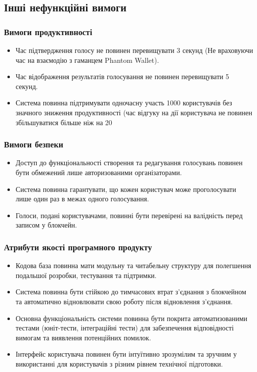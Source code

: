 \documentclass[14pt]{extreport}
\begin{document}
  \subsection{Інші нефункційні вимоги}
  \subsubsection{Вимоги продуктивності}
  \begin{itemize}
    \item Час підтвердження голосу не повинен перевищувати 3 секунд (Не враховуючи час на взаємодію з гаманцем Phantom Wallet).
    \item Час відображення результатів голосування не повинен перевищувати 5 секунд.  
    \item Система повинна підтримувати одночасну участь 1000 користувачів без значного зниження продуктивності (час відгуку на дії користувача не повинен збільшуватися більше ніж на 20%
  \end{itemize}

  \subsubsection{Вимоги безпеки}
  \begin{itemize}
    \item Доступ до функціональності створення та редагування голосувань повинен бути обмежений лише авторизованими організаторами.
    \item Система повинна гарантувати, що кожен користувач може проголосувати лише один раз в межах одного голосування.
    \item Голоси, подані користувачами, повинні бути перевірені на валідність перед записом у блокчейн.
  \end{itemize}
  
  \subsubsection{Атрибути якості програмного продукту}
  \begin{itemize}  
    \item Кодова база повинна мати модульну та читабельну структуру для полегшення подальшої розробки, тестування та підтримки.
    \item Система повинна бути стійкою до тимчасових втрат з'єднання з блокчейном та автоматично відновлювати свою роботу після відновлення з'єднання.
    \item Основна функціональність системи повинна бути покрита автоматизованими тестами (юніт-тести, інтеграційні тести) для забезпечення відповідності вимогам та виявлення потенційних помилок.
    \item Інтерфейс користувача повинен бути інтуїтивно зрозумілим та зручним у використанні для користувачів з різним рівнем технічної підготовки.
  \end{itemize}
\end{document}
